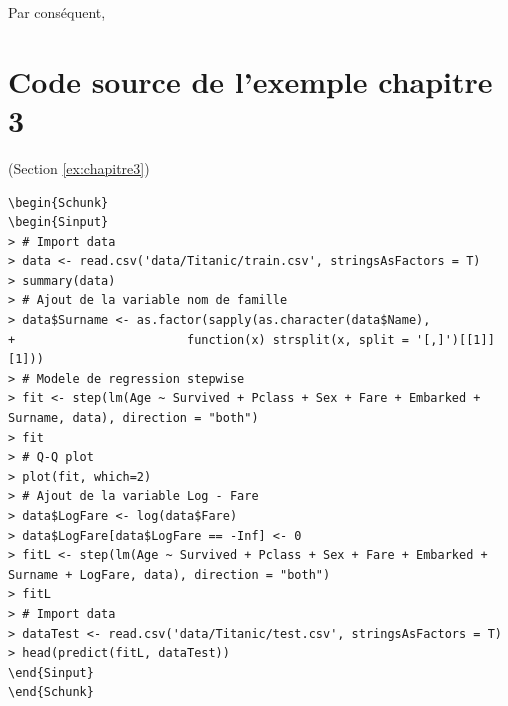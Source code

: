 \documentclass[11pt,french]{report}
\begin{document}
Par conséquent,

\newpage

\appendix

\chapter{Code source de l'exemple chapitre 3}
\label{codesour:chap3}
(Section \ref{ex:chapitre3})

\begin{lstlisting}[linerange=\\begin\{Sinput\}-\\end\{Sinput\},includerangemarker=false, caption = Code source en R pour l'exemple]
\begin{Schunk}
\begin{Sinput}
> # Import data
> data <- read.csv('data/Titanic/train.csv', stringsAsFactors = T)
> summary(data)
> # Ajout de la variable nom de famille
> data$Surname <- as.factor(sapply(as.character(data$Name),  
+                        function(x) strsplit(x, split = '[,]')[[1]][1]))
> # Modele de regression stepwise
> fit <- step(lm(Age ~ Survived + Pclass + Sex + Fare + Embarked + Surname, data), direction = "both")
> fit
> # Q-Q plot 
> plot(fit, which=2)
> # Ajout de la variable Log - Fare
> data$LogFare <- log(data$Fare)
> data$LogFare[data$LogFare == -Inf] <- 0
> fitL <- step(lm(Age ~ Survived + Pclass + Sex + Fare + Embarked + Surname + LogFare, data), direction = "both")
> fitL
> # Import data
> dataTest <- read.csv('data/Titanic/test.csv', stringsAsFactors = T)
> head(predict(fitL, dataTest))
\end{Sinput}
\end{Schunk}
\end{lstlisting}
\end{document}
